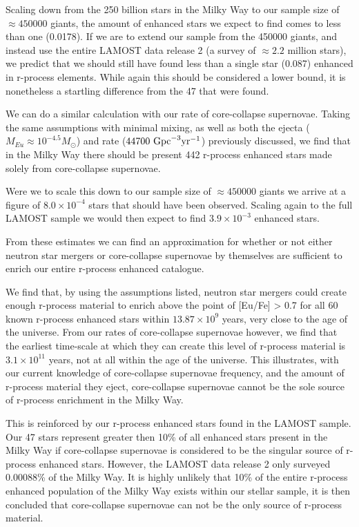 \documentclass[a4paper,fleqn,usenatbib]{mnras}
\begin{document}
    Scaling down from the 250 billion stars in the Milky Way to our sample size of $\approx450000$ giants, the amount of enhanced stars we expect to find comes to less than one (0.0178). If we are to extend our sample from the 450000 giants, and instead use the entire LAMOST data release 2 (a survey of $\approx2.2$ million stars), we predict that we should still have found less than a single star (0.087) enhanced in r-process elements. While again this should be considered a lower bound, it is nonetheless a startling difference from the 47 that were found.
    
    We can do a similar calculation with our rate of core-collapse supernovae. Taking the same assumptions with minimal mixing, as well as both the ejecta ($M_{Eu}\approx10^{-4.5} M_{\odot}$) and rate ($44700\ \rm{Gpc}^{-3} \rm{yr^{-1}}$) previously discussed, we find that in the Milky Way there should be present 442 r-process enhanced stars made solely from core-collapse supernovae.
    
    Were we to scale this down to our sample size of $\approx450000$ giants we arrive at a figure of $8.0\times10^{-4}$ stars that should have been observed. Scaling again to the full LAMOST sample we would then expect to find $3.9\times10^{-3}$ enhanced stars. 
    
    From these estimates we can find an approximation for whether or not either neutron star mergers or core-collapse supernovae by themselves are sufficient to enrich our entire r-process enhanced catalogue. 
    
    We find that, by using the assumptions listed, neutron star mergers could create enough r-process material to enrich above the point of [Eu/Fe] > 0.7 for all 60 known r-process enhanced stars within $13.87\times10^9$ years, very close to the age of the universe. From our rates of core-collapse supernovae however, we find that the earliest time-scale at which they can create this level of r-process material is $3.1\times10^{11}$ years, not at all within the age of the universe. This illustrates, with our current knowledge of core-collapse supernovae frequency, and the amount of r-process material they eject, core-collapse supernovae cannot be the sole source of r-process enrichment in the Milky Way.
    
    This is reinforced by our r-process enhanced stars found in the LAMOST sample. Our 47 stars represent greater then 10\% of all enhanced stars present in the Milky Way if core-collapse supernovae is considered to be the singular source of r-process enhanced stars. However, the LAMOST data release 2 only surveyed 0.00088\% of the Milky Way. It is highly unlikely that 10\% of the entire r-process enhanced population of the Milky Way exists within our stellar sample, it is then concluded that core-collapse supernovae can not be the only source of r-process material. 
    
\end{document}
